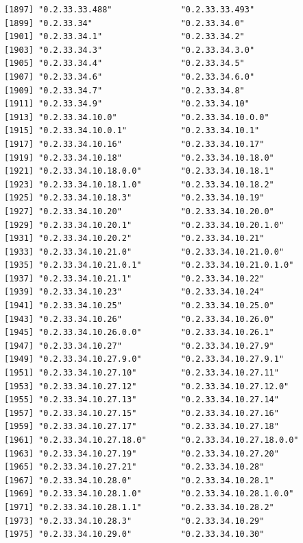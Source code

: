 \documentclass[
  letterpaper,
  DIV=11,
  numbers=noendperiod]{scrreprt}
\begin{document}
\begin{verbatim}
[1897] "0.2.33.33.488"              "0.2.33.33.493"             
[1899] "0.2.33.34"                  "0.2.33.34.0"               
[1901] "0.2.33.34.1"                "0.2.33.34.2"               
[1903] "0.2.33.34.3"                "0.2.33.34.3.0"             
[1905] "0.2.33.34.4"                "0.2.33.34.5"               
[1907] "0.2.33.34.6"                "0.2.33.34.6.0"             
[1909] "0.2.33.34.7"                "0.2.33.34.8"               
[1911] "0.2.33.34.9"                "0.2.33.34.10"              
[1913] "0.2.33.34.10.0"             "0.2.33.34.10.0.0"          
[1915] "0.2.33.34.10.0.1"           "0.2.33.34.10.1"            
[1917] "0.2.33.34.10.16"            "0.2.33.34.10.17"           
[1919] "0.2.33.34.10.18"            "0.2.33.34.10.18.0"         
[1921] "0.2.33.34.10.18.0.0"        "0.2.33.34.10.18.1"         
[1923] "0.2.33.34.10.18.1.0"        "0.2.33.34.10.18.2"         
[1925] "0.2.33.34.10.18.3"          "0.2.33.34.10.19"           
[1927] "0.2.33.34.10.20"            "0.2.33.34.10.20.0"         
[1929] "0.2.33.34.10.20.1"          "0.2.33.34.10.20.1.0"       
[1931] "0.2.33.34.10.20.2"          "0.2.33.34.10.21"           
[1933] "0.2.33.34.10.21.0"          "0.2.33.34.10.21.0.0"       
[1935] "0.2.33.34.10.21.0.1"        "0.2.33.34.10.21.0.1.0"     
[1937] "0.2.33.34.10.21.1"          "0.2.33.34.10.22"           
[1939] "0.2.33.34.10.23"            "0.2.33.34.10.24"           
[1941] "0.2.33.34.10.25"            "0.2.33.34.10.25.0"         
[1943] "0.2.33.34.10.26"            "0.2.33.34.10.26.0"         
[1945] "0.2.33.34.10.26.0.0"        "0.2.33.34.10.26.1"         
[1947] "0.2.33.34.10.27"            "0.2.33.34.10.27.9"         
[1949] "0.2.33.34.10.27.9.0"        "0.2.33.34.10.27.9.1"       
[1951] "0.2.33.34.10.27.10"         "0.2.33.34.10.27.11"        
[1953] "0.2.33.34.10.27.12"         "0.2.33.34.10.27.12.0"      
[1955] "0.2.33.34.10.27.13"         "0.2.33.34.10.27.14"        
[1957] "0.2.33.34.10.27.15"         "0.2.33.34.10.27.16"        
[1959] "0.2.33.34.10.27.17"         "0.2.33.34.10.27.18"        
[1961] "0.2.33.34.10.27.18.0"       "0.2.33.34.10.27.18.0.0"    
[1963] "0.2.33.34.10.27.19"         "0.2.33.34.10.27.20"        
[1965] "0.2.33.34.10.27.21"         "0.2.33.34.10.28"           
[1967] "0.2.33.34.10.28.0"          "0.2.33.34.10.28.1"         
[1969] "0.2.33.34.10.28.1.0"        "0.2.33.34.10.28.1.0.0"     
[1971] "0.2.33.34.10.28.1.1"        "0.2.33.34.10.28.2"         
[1973] "0.2.33.34.10.28.3"          "0.2.33.34.10.29"           
[1975] "0.2.33.34.10.29.0"          "0.2.33.34.10.30"           

\end{verbatim}
\end{document}
